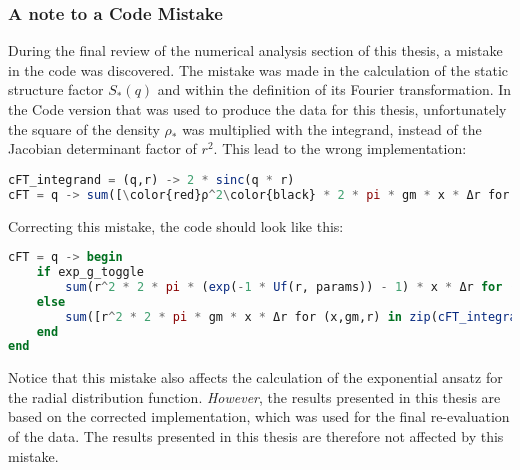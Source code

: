 \subsubsection*{A note to a Code Mistake}
During the final review of the numerical analysis section of this thesis, a mistake in the code was discovered. The mistake was made in the calculation of the static structure factor $S_*(q)$ and within the definition of its Fourier transformation. In the Code version that was used to produce the data for this thesis, unfortunately the square of the density $\rho_*$ was multiplied with the integrand, instead of the Jacobian determinant factor of $r^2$. This lead to the wrong implementation:
\begin{mdframed}[backgroundcolor=black!4, topline=false, bottomline=false, rightline=false, leftline=false]
    \begin{lstlisting}[language=Julia,basicstyle=\small]
cFT_integrand = (q,r) -> 2 * sinc(q * r)
cFT = q -> sum([\color{red}ρ^2\color{black} * 2 * pi * gm * x * Δr for (x,gm) in zip(cFT_integrand.(q, solution.r),[x - 1 for x in solution.gr])])
    \end{lstlisting}
\end{mdframed}
Correcting this mistake, the code should look like this:
\begin{mdframed}[backgroundcolor=black!4, topline=false, bottomline=false, rightline=false, leftline=false]
    \begin{lstlisting}[language=Julia,basicstyle=\small]
cFT = q -> begin
	if exp_g_toggle
		sum(r^2 * 2 * pi * (exp(-1 * Uf(r, params)) - 1) * x * Δr for (x,r) in zip(cFT_integrand.(q, solution.r),solution.r))
	else 
		sum([r^2 * 2 * pi * gm * x * Δr for (x,gm,r) in zip(cFT_integrand.(q, solution.r),[x - 1 for x in solution.gr],solution.r)]) # use cFT_integrand on all r values from solution.r, then discretely integr.
	end
end
    \end{lstlisting}
\end{mdframed}
Notice that this mistake also affects the calculation of the exponential ansatz for the radial distribution function. \emph{However}, the results presented in this thesis are based on the corrected implementation, which was used for the final re-evaluation of the data. The results presented in this thesis are therefore not affected by this mistake.




